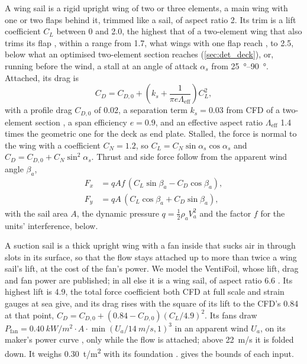 A wing sail is a rigid upright wing of two or three elements, a main wing with one or two flaps behind it, trimmed like a sail, of aspect ratio 2. Its trim is a lift coefficient $C_L$ between 0 and 2.0, the highest that of a two-element wing that also trims its flap \citep{wright2024wingsail}, within a range from 1.7, what wings with one flap reach \citep{rechevilanova2021}, to 2.5, below what an optimised two-element section reaches \citep{yao2026} (\cref{sec:det_deck}), or, running before the wind, a stall at an angle of attack $\alpha_s$ from \SIrange{25}{90}{\degree}. Attached, its drag is
\begin{equation}
C_D = C_{D,0} + \left(k_s + \frac{1}{\pi e \Lambda_\mathrm{eff}}\right) C_L^2,
\end{equation}
with a profile drag $C_{D,0}$ of 0.02, a separation term $k_s=0.03$ from CFD of a two-element section \citep{yao2026}, a span efficiency $e=0.9$, and an effective aspect ratio $\Lambda_\mathrm{eff}$ 1.4 times the geometric one for the deck as end plate. Stalled, the force is normal to the wing with a coefficient $C_N=1.2$, so $C_L=C_N\sin\alpha_s\cos\alpha_s$ and $C_D=C_{D,0}+C_N\sin^2\alpha_s$. Thrust and side force follow from the apparent wind angle $\beta_a$,
\begin{align}
F_x &= q A f\, (C_L\sin\beta_a - C_D\cos\beta_a),\\
F_y &= q A\, (C_L\cos\beta_a + C_D\sin\beta_a),
\end{align}
with the sail area $A$, the dynamic pressure $q=\tfrac12\rho_a V_a^2$ and the factor $f$ for the units' interference, below.

A suction sail is a thick upright wing with a fan inside that sucks air in through slots in its surface, so that the flow stays attached up to more than twice a wing sail's lift, at the cost of the fan's power. We model the VentiFoil, whose lift, drag and fan power are published; in all else it is a wing sail, of aspect ratio 6.6 \citep{conoship2022econowind}. Its highest lift is 4.9, the total force coefficient both CFD at full scale \citep{lagendijk2018} and strain gauges at sea \citep{ghorbani2024suction} give, and its drag rises with the square of its lift to the CFD's 0.84 at that point, $C_D = C_{D,0} + (0.84 - C_{D,0})(C_L/4.9)^2$. Its fans draw $P_\mathrm{fan} = \SI{0.40}{kW/m^2} \cdot A \cdot \min(U_a / \SI{14}{m/s}, 1)^3$ in an apparent wind $U_a$, on its maker's power curve \citep{smeets2024ventofoil}, only while the flow is attached; above \SI{22}{m/s} it is folded down. It weighs \SI{0.30}{t/m^2} with its foundation \citep{conoship2022econowind}.  gives the bounds of each input.

